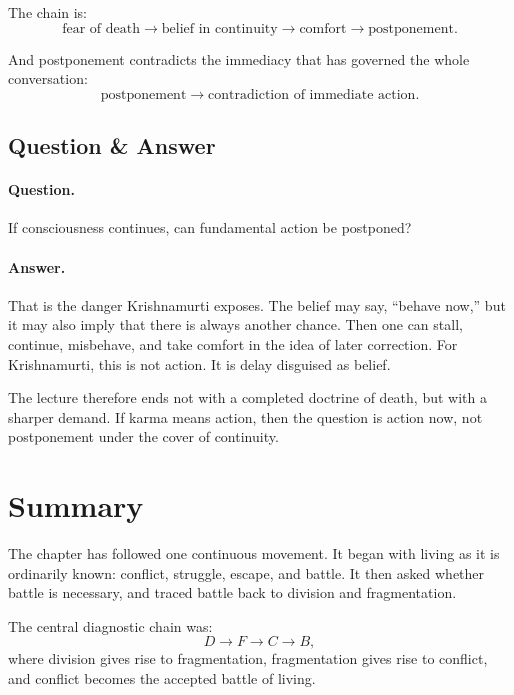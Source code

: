 The chain is:
\begin{equation}
\text{fear of death}
   \longrightarrow
\text{belief in continuity}
   \longrightarrow
\text{comfort}
   \longrightarrow
\text{postponement}.
\end{equation}

And postponement contradicts the immediacy that has governed the whole conversation:
\begin{equation}
\text{postponement}
   \longrightarrow
\text{contradiction of immediate action}.
\end{equation}

\subsection{Question \& Answer}

\paragraph{Question.}
If consciousness continues, can fundamental action be postponed?

\paragraph{Answer.}
That is the danger Krishnamurti exposes. The belief may say, ``behave now,'' but it may also imply that there is always another chance. Then one can stall, continue, misbehave, and take comfort in the idea of later correction. For Krishnamurti, this is not action. It is delay disguised as belief.

The lecture therefore ends not with a completed doctrine of death, but with a sharper demand. If karma means action, then the question is action now, not postponement under the cover of continuity.

\section{Summary}

The chapter has followed one continuous movement. It began with living as it is ordinarily known: conflict, struggle, escape, and battle. It then asked whether battle is necessary, and traced battle back to division and fragmentation.

The central diagnostic chain was:
\begin{equation}
D \longrightarrow F \longrightarrow C \longrightarrow B,
\end{equation}
where division gives rise to fragmentation, fragmentation gives rise to conflict, and conflict becomes the accepted battle of living.

